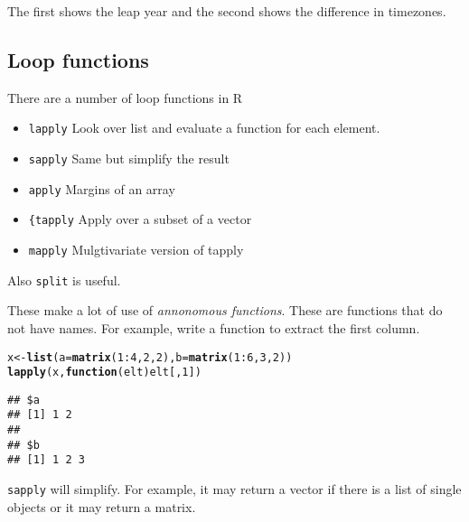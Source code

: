 \documentclass[12pt, a4paper, oneside]{article}\usepackage[]{graphicx}\usepackage[]{color}
\makeatletter
\newcommand{\hlnum}[1]{\textcolor[rgb]{0.686,0.059,0.569}{#1}}%
\newcommand{\hlopt}[1]{\textcolor[rgb]{0,0,0}{#1}}%
\newcommand{\hlstd}[1]{\textcolor[rgb]{0.345,0.345,0.345}{#1}}%
\newcommand{\hlkwa}[1]{\textcolor[rgb]{0.161,0.373,0.58}{\textbf{#1}}}%
\newcommand{\hlkwb}[1]{\textcolor[rgb]{0.69,0.353,0.396}{#1}}%
\newcommand{\hlkwc}[1]{\textcolor[rgb]{0.333,0.667,0.333}{#1}}%
\newcommand{\hlkwd}[1]{\textcolor[rgb]{0.737,0.353,0.396}{\textbf{#1}}}%
\newenvironment{kframe}{%
 \def\at@end@of@kframe{}%
 \ifinner\ifhmode%
  \def\at@end@of@kframe{\end{minipage}}%
  \begin{minipage}{\columnwidth}%
 \fi\fi%
 \def\FrameCommand##1{\hskip\@totalleftmargin \hskip-\fboxsep
 \colorbox{shadecolor}{##1}\hskip-\fboxsep
     \hskip-\linewidth \hskip-\@totalleftmargin \hskip\columnwidth}%
 \MakeFramed {\advance\hsize-\width
   \@totalleftmargin\z@ \linewidth\hsize
   \@setminipage}}%
 {\par\unskip\endMakeFramed%
 \at@end@of@kframe}
\newenvironment{knitrout}{}{} %
\makeatother
\begin{document}
The first shows the leap year and the second shows the difference in timezones. 
\subsection{Loop functions}
There are a number of loop functions in R
\begin{itemize}
\item \lstinline{lapply} Look over list and evaluate a function for each element.
\item \lstinline{sapply} Same but simplify the result
\item \lstinline{apply} Margins of an array
\item \lstinline{{tapply} Apply over a subset of a vector
\item \lstinline{mapply} Mulgtivariate version of tapply
\end{itemize}

Also \lstinline{split} is useful. 

These make a lot of use of \emph{annonomous functions}.  These are functions that do not have names. For example, write a function to extract the first column.
\begin{knitrout}
\color{fgcolor}\begin{kframe}
\begin{alltt}
\hlstd{x} \hlkwb{<-} \hlkwd{list}\hlstd{(}\hlkwc{a} \hlstd{=} \hlkwd{matrix}\hlstd{(}\hlnum{1}\hlopt{:}\hlnum{4}\hlstd{,} \hlnum{2}\hlstd{,} \hlnum{2}\hlstd{),} \hlkwc{b} \hlstd{=} \hlkwd{matrix}\hlstd{(}\hlnum{1}\hlopt{:}\hlnum{6}\hlstd{,} \hlnum{3}\hlstd{,} \hlnum{2}\hlstd{))}
\hlkwd{lapply}\hlstd{(x,} \hlkwa{function}\hlstd{(}\hlkwc{elt}\hlstd{) elt[,} \hlnum{1}\hlstd{])}
\end{alltt}
\begin{verbatim}
## $a
## [1] 1 2
## 
## $b
## [1] 1 2 3
\end{verbatim}
\end{kframe}
\end{knitrout}

\lstinline{sapply} will simplify.  For example, it may return a vector if there is a list of single objects or it may return a matrix. 
\end{document}

